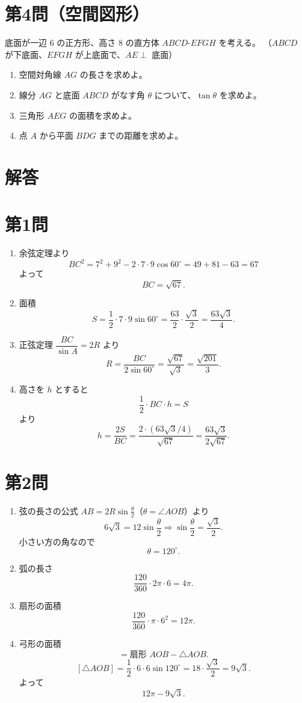 \documentclass[a4paper,12pt]{ltjsarticle}
\begin{document}
\section*{第4問（空間図形）}
底面が一辺 \(6\) の正方形、高さ \(8\) の直方体 \(ABCD\text{-}EFGH\) を考える。  
（\(ABCD\) が下底面、\(EFGH\) が上底面で、\(AE\perp\) 底面）
\begin{enumerate}[label=\arabic*.]
  \item 空間対角線 \(AG\) の長さを求めよ。
  \item 線分 \(AG\) と底面 \(ABCD\) がなす角 \(\theta\) について、\(\tan\theta\) を求めよ。
  \item 三角形 \(AEG\) の面積を求めよ。
  \item 点 \(A\) から平面 \(BDG\) までの距離を求めよ。
\end{enumerate}

\newpage
\section*{解答}

\section*{第1問}
\begin{enumerate}[label=\arabic*.]
  \item 余弦定理より
  \[
  BC^2=7^2+9^2-2\cdot7\cdot9\cos60^\circ=49+81-63=67
  \]
  よって
  \[
  BC=\sqrt{67}.
  \]
  \item 面積
  \[
  S=\frac12\cdot7\cdot9\sin60^\circ
  =\frac{63}{2}\cdot\frac{\sqrt3}{2}
  =\frac{63\sqrt3}{4}.
  \]
  \item 正弦定理 \( \dfrac{BC}{\sin A}=2R \) より
  \[
  R=\frac{BC}{2\sin60^\circ}
  =\frac{\sqrt{67}}{\sqrt3}
  =\frac{\sqrt{201}}{3}.
  \]
  \item 高さを \(h\) とすると
  \[
  \frac12\cdot BC\cdot h=S
  \]
  より
  \[
  h=\frac{2S}{BC}
  =\frac{2\cdot(63\sqrt3/4)}{\sqrt{67}}
  =\frac{63\sqrt3}{2\sqrt{67}}.
  \]
\end{enumerate}

\section*{第2問}
\begin{enumerate}[label=\arabic*.]
  \item 弦の長さの公式 \(AB=2R\sin\frac{\theta}{2}\)（\(\theta=\angle AOB\)）より
  \[
  6\sqrt3=12\sin\frac{\theta}{2}
  \Rightarrow \sin\frac{\theta}{2}=\frac{\sqrt3}{2}.
  \]
  小さい方の角なので
  \[
  \theta=120^\circ.
  \]
  \item 弧の長さ
  \[
  \frac{120}{360}\cdot2\pi\cdot6=4\pi.
  \]
  \item 扇形の面積
  \[
  \frac{120}{360}\cdot\pi\cdot6^2=12\pi.
  \]
  \item 弓形の面積
  \[
  =\text{扇形 }AOB-\triangle AOB.
  \]
  \[
  [\triangle AOB]=\frac12\cdot6\cdot6\sin120^\circ
  =18\cdot\frac{\sqrt3}{2}=9\sqrt3.
  \]
  よって
  \[
  12\pi-9\sqrt3.
  \]
\end{enumerate}
\end{document}
